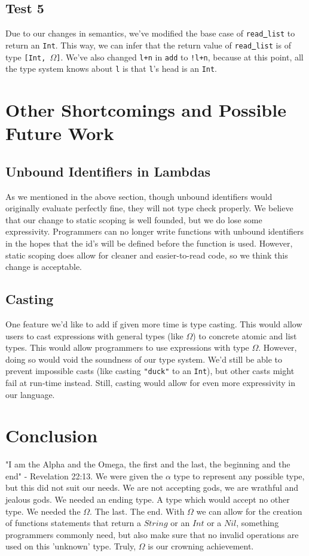 \documentclass[12pt]{article}
\begin{document}
\subsection{Test 5}
Due to our changes in semantics, we've modified the base case of \texttt{read\underline{\ }list} to return an \texttt{Int}. This way, we can infer that the return value of \texttt{read\underline{\ }list} is of type \texttt{[Int, $\Omega$]}. We've also changed \texttt{l+n} in \texttt{add} to \texttt{!l+n}, because at this point, all the type system knows about \texttt{l} is that \texttt{l}'s head is an \texttt{Int}.

\section{Other Shortcomings and Possible Future Work}

\subsection{Unbound Identifiers in Lambdas}
As we mentioned in the above section, though unbound identifiers would originally evaluate perfectly fine, they will not type check properly. We believe that our change to static scoping is well founded, but we do lose some expressivity. Programmers can no longer write functions with unbound identifiers in the hopes that the id's will be defined before the function is used. However, static scoping does allow for cleaner and easier-to-read code, so we think this change is acceptable.

\subsection{Casting}
One feature we'd like to add if given more time is type casting. This would allow users to cast expressions with general types (like $\Omega$) to concrete atomic and list types. This would allow programmers to use expressions with type $\Omega$. However, doing so would void the soundness of our type system. We'd still be able to prevent impossible casts (like casting \texttt{"duck"} to an \texttt{Int}), but other casts might fail at run-time instead. Still, casting would allow for even more expressivity in our language. 

\section{Conclusion}

"I am the Alpha and the Omega, the first and the last, the beginning and the end" - Revelation 22:13. We were given the $\alpha$ type to represent any possible type, but this did not suit our needs. We are not accepting gods, we are wrathful and jealous gods. We needed an ending type. A type which would accept no other type. We needed the $\Omega$. The last. The end. With $\Omega$ we can allow for the creation of functions statements that return a $String$ or an $Int$ or a $Nil$, something programmers commonly need, but also make sure that no invalid operations are used on this 'unknown' type. Truly, $\Omega$ is our crowning achievement.
\end{document}
